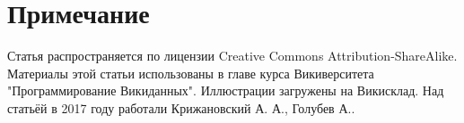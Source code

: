 \section{Примечание}

Статья распространяется по лицензии Creative Commons Attribution-ShareAlike. Материалы этой статьи использованы в главе курса Викиверситета "Программирование Викиданных"\cite{WDCountry}. Иллюстрации загружены на Викисклад. Над статьёй в 2017 году работали Крижановский А. А., Голубев А..